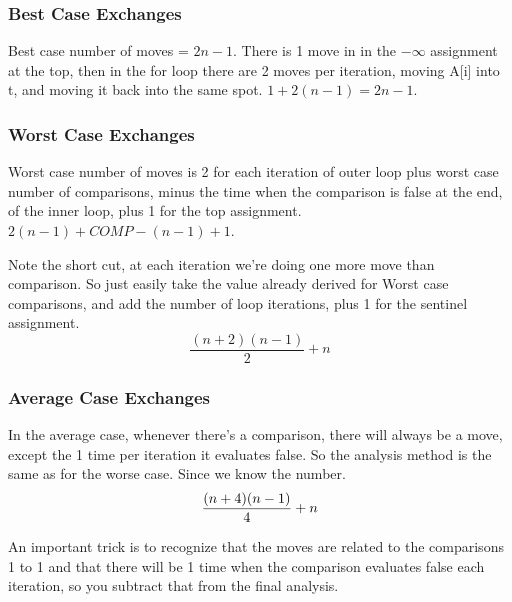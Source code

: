 \documentclass[english, 10pt]{article}
\begin{document}
\subsubsection{Best Case Exchanges}

Best case number of moves = $2n-1$. There is 1 move in in the $-\infty$
assignment at the top, then in the for loop there are 2 moves per iteration,
moving A[i] into t, and moving it back into the same spot. $1 + 2(n-1) = 2n
-1$.

\subsubsection{Worst Case Exchanges}

Worst case number of moves is 2 for each iteration of outer loop plus worst
case number of comparisons, minus the time when the comparison is false at the
end, of the inner loop, plus 1 for the top assignment. $2(n-1) + COMP - (n-1)
+1 $.

Note the short cut, at each iteration we're doing one more move than
comparison. So just easily take the value already derived for Worst case
comparisons, and add the number of loop iterations, plus 1 for the sentinel
assignment.  $$\frac{(n+2)(n-1)}{2} +n $$

\subsubsection{Average Case Exchanges}

In the average case, whenever there's a comparison, there will always be a
move, except the 1 time per iteration it evaluates false.  So the analysis
method is the same as for the worse case. Since we know the number.  $$\frac{(n+4)
(n-1)}{4} + n$$

\begin{rem}

An important trick is to recognize that the moves are related to the
comparisons 1 to 1 and that there will be 1 time when the comparison evaluates
false each iteration, so you subtract that from the final analysis.

\end{rem}
\end{document}
